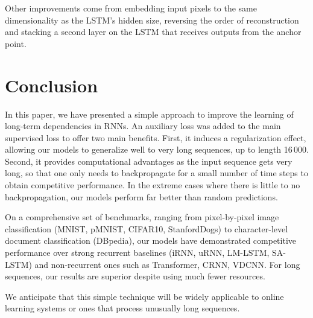 \documentclass{article}
\begin{document}
Other improvements come from embedding input pixels to the same dimensionality as the LSTM's hidden size, reversing the order of reconstruction and stacking a second layer on the LSTM that receives outputs from the anchor point.

\section{Conclusion}
In this paper, we have presented a simple approach to improve the learning of long-term dependencies in RNNs. An auxiliary loss was added to the main supervised loss to offer two main benefits. 
First, it induces a regularization effect, allowing our models to generalize well to very long sequences, up to length 16\,000.
Second, it provides computational advantages as the input sequence gets very long, so that
one only needs to backpropagate for a small number of time steps to obtain competitive performance. In the extreme cases where there is little to no backpropagation, our models perform far better than random predictions.

On a comprehensive set of benchmarks, ranging from pixel-by-pixel image classification (MNIST, pMNIST, CIFAR10, StanfordDogs) to character-level document classification (DBpedia), our models have demonstrated competitive performance over strong recurrent baselines (iRNN, uRNN, LM-LSTM, SA-LSTM) and non-recurrent ones such as Transformer, CRNN, VDCNN. For long sequences, our results are superior despite using much fewer resources.

We anticipate that this simple technique will be widely applicable to online learning systems or ones that process unusually long sequences.




\end{document}
